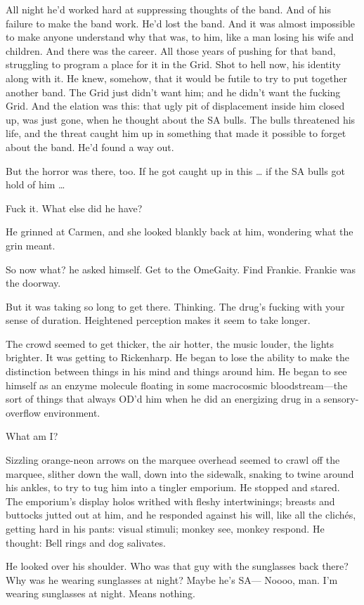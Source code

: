 All night he’d worked hard at suppressing thoughts of the band. And of his failure to make the band work. He’d lost the band. And it was almost impossible to make anyone understand why that was, to him, like a man losing his wife and children. And there was the career. All those years of pushing for that band, struggling to program a place for it in the Grid. Shot to hell now, his identity along with it. He knew, somehow, that it would be futile to try to put together another band. The Grid just didn’t want him; and he didn’t want the fucking Grid. And the elation was this: that ugly pit of displacement inside him closed up, was just gone, when he thought about the SA bulls. The bulls threatened his life, and the threat caught him up in something that made it possible to forget about the band. He’d found a way out.

But the horror was there, too. If he got caught up in this … if the SA bulls got hold of him …

Fuck it. What else did he have?

He grinned at Carmen, and she looked blankly back at him, wondering what the grin meant.

So now what? he asked himself. Get to the OmeGaity. Find Frankie. Frankie was the doorway.

But it was taking so long to get there. Thinking. The drug’s fucking with your sense of duration. Heightened perception makes it seem to take longer.

The crowd seemed to get thicker, the air hotter, the music louder, the lights brighter. It was getting to Rickenharp. He began to lose the ability to make the distinction between things in his mind and things around him. He began to see himself as an enzyme molecule floating in some macrocosmic bloodstream—the sort of things that always OD’d him when he did an energizing drug in a sensory-overflow environment.

What am I?

Sizzling orange-neon arrows on the marquee overhead seemed to crawl off the marquee, slither down the wall, down into the sidewalk, snaking to twine around his ankles, to try to tug him into a tingler emporium. He stopped and stared. The emporium’s display holos writhed with fleshy intertwinings; breasts and buttocks jutted out at him, and he responded against his will, like all the clichés, getting hard in his pants: visual stimuli; monkey see, monkey respond. He thought: Bell rings and dog salivates.

He looked over his shoulder. Who was that guy with the sunglasses back there? Why was he wearing sunglasses at night? Maybe he’s SA— Noooo, man. I’m wearing sunglasses at night. Means nothing.

